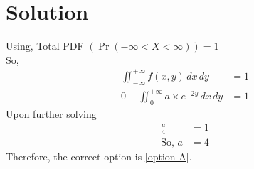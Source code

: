 \documentclass[twocolumn]{article}
\providecommand{\pr}[1]{\ensuremath{\Pr\left(#1\right)}}
\begin{document}
\section*{Solution}
Using, Total PDF $(\pr{-\infty < X < \infty})=1$  \\
So,
\begin{align}
\iint_{-\infty}^{+\infty}  f(x,y) \,dx\,dy &= 1 \\
 0 + \iint_{0}^{+\infty} a \times e^{-2y} \,dx\,dy  &= 1 
\end{align}
Upon further solving
\begin{align}
\frac{a}{4} &= 1 \\
\text{So,  } a &= 4
\end{align}
 Therefore, the correct option is \ref{option A}.  

\end{document}
